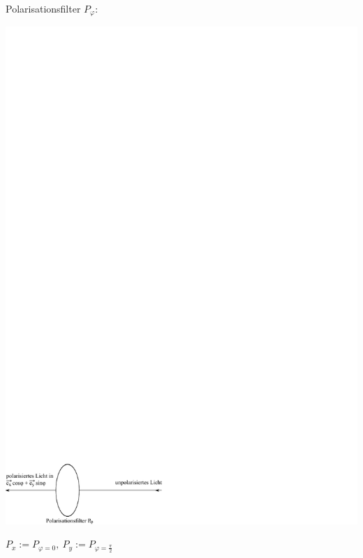 \documentclass[a4paper]{scrartcl}
\begin{document}
{Polarisationsfilter $P_\varphi$:
\begin{center}
\includegraphics{003Polarisationsfilter1}
\end{center}
$P_x := P_{\varphi = 0}, \ P_y := P_{\varphi = \frac\pi2}$
\begin{center}

\end{center}}
\end{document}
